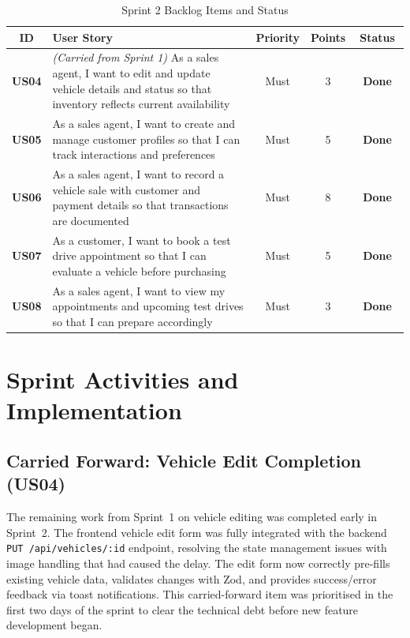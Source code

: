 \documentclass[12pt,a4paper]{article}
\newcommand{\thead}[1]{\textbf{\color{white}#1}}
\newcommand{\done}{\colorbox{GreenBg}{\color{GreenText}\small\textbf{~Done~}}}
\begin{document}
\begin{table}[H]
\centering
\renewcommand{\arraystretch}{1.3}
\footnotesize
\begin{tabularx}{\textwidth}{|c|Y|c|c|c|}
\hline
{} \thead{ID} & \thead{User Story} & \thead{Priority} & \thead{Points} & \thead{Status} \\
\hline
{}
\textbf{US04} & \textit{(Carried from Sprint 1)} As a sales agent, I want to edit and update vehicle details and status so that inventory reflects current availability & Must & 3 & \done \\
\hline
\textbf{US05} & As a sales agent, I want to create and manage customer profiles so that I can track interactions and preferences & Must & 5 & \done \\
\hline
{}
\textbf{US06} & As a sales agent, I want to record a vehicle sale with customer and payment details so that transactions are documented & Must & 8 & \done \\
\hline
\textbf{US07} & As a customer, I want to book a test drive appointment so that I can evaluate a vehicle before purchasing & Must & 5 & \done \\
\hline
{}
\textbf{US08} & As a sales agent, I want to view my appointments and upcoming test drives so that I can prepare accordingly & Must & 3 & \done \\
\hline
\end{tabularx}
\caption{Sprint 2 Backlog Items and Status}
\end{table}

\section{Sprint Activities and Implementation}

\subsection{Carried Forward: Vehicle Edit Completion (US04)}

The remaining work from Sprint~1 on vehicle editing was completed early in Sprint~2. The frontend vehicle edit form was fully integrated with the backend \texttt{PUT /api/vehicles/:id} endpoint, resolving the state management issues with image handling that had caused the delay. The edit form now correctly pre-fills existing vehicle data, validates changes with Zod, and provides success/error feedback via toast notifications. This carried-forward item was prioritised in the first two days of the sprint to clear the technical debt before new feature development began.
\end{document}
